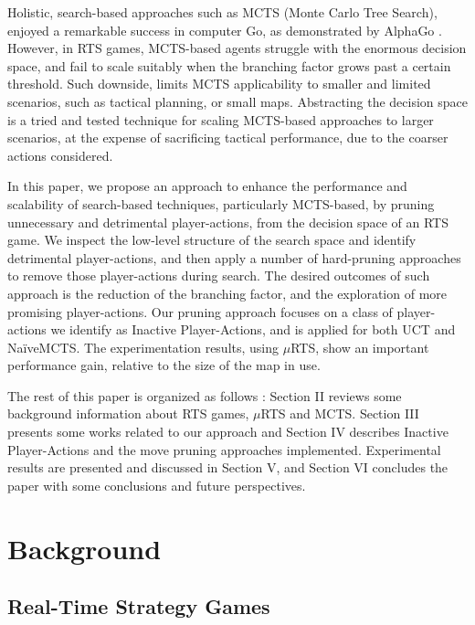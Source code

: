 \documentclass[conference]{IEEEtran}
\newcommand{\mRTS}{$\mu$RTS}
\begin{document}
Holistic, search-based approaches such as MCTS (Monte Carlo Tree Search), enjoyed a remarkable success in computer Go, as demonstrated by AlphaGo \cite{silver_mastering_2016}. However, in RTS games, MCTS-based agents struggle with the enormous decision space, and fail to scale suitably when the branching factor grows past a certain threshold. Such downside, limits MCTS applicability to smaller and limited scenarios, such as tactical planning, or small maps. Abstracting the decision space is a tried and tested technique for scaling MCTS-based approaches to larger scenarios, at the expense of sacrificing tactical performance, due to the coarser actions considered.

In this paper, we propose an approach to enhance the performance and scalability of search-based techniques, particularly MCTS-based, by pruning unnecessary and detrimental player-actions, from the decision space of an RTS game. We inspect the low-level structure of the search space and identify detrimental player-actions, and then apply a number of hard-pruning approaches to remove those player-actions during search. The desired outcomes of such approach is the reduction of the branching factor, and the exploration of more promising player-actions. Our pruning approach focuses on a class of player-actions we identify as Inactive Player-Actions, and is applied for both UCT and NaïveMCTS. The experimentation results, using \mRTS{}, show an important performance gain, relative to the size of the map in use.

The rest of this paper is organized as follows : Section II reviews some background information about RTS games, \mRTS{} and MCTS. Section III presents some works related to our approach and Section IV describes Inactive Player-Actions and the move pruning approaches implemented. Experimental results are presented and discussed in Section V, and Section VI concludes the paper with some conclusions and future perspectives.

\section{Background}

\subsection{Real-Time Strategy Games}
\end{document}
